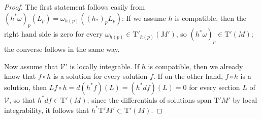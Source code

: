 \documentclass[11pt]{amsart}
\newcommand{\crb}{\mathcal{V}}
\newcommand{\holforms}{\mathrm{T}'}
\theoremstyle{definition}
\theoremstyle{remark}
\theoremstyle{plain}
\begin{document}
\begin{proof}
  The first statement follows easily from $(h^* \omega)_p (L_p) = \omega_{h(p)} ((h_*)_p L_p)$: If we
  assume $h$ is compatible, then the right hand side is zero for every $\omega_{h(p)} \in \mathrm{T}'_{h(p)}( M')$,
  so $(h^* \omega)_p \in \holforms(M)$; the converse follows in the same way.

  Now assume that $\crb'$ is locally integrable. If $h$ is compatible, then
  we already know that $f\circ h$ is a solution for every solution $f$. If on the
  other hand, $f \circ h$ is a solution, then $ L f\circ h= d(h^*f) (L) = (h^* df) (L) = 0$ for every section
  $L$ of $\crb$, so
  that $h^* df \in  \holforms(M)$; since the differentials of solutions span $\holforms{M'}$ by local integrability,
  it follows that $h^* \holforms{M'} \subset \holforms(M)$. 
\end{proof}
\end{document}
